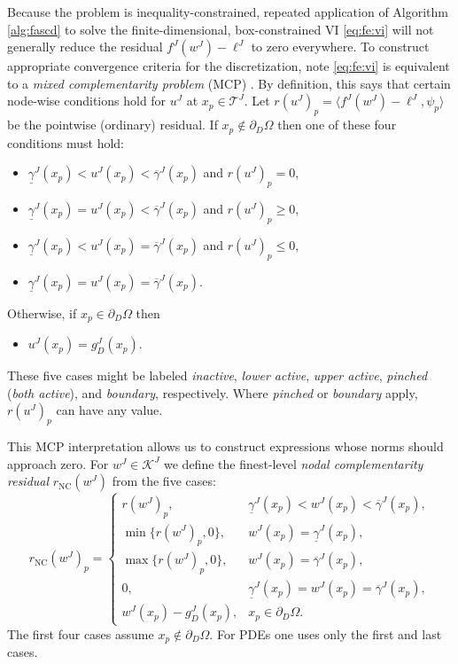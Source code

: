 \documentclass[letterpaper,final,12pt,reqno]{amsart}
\theoremstyle{cstyle}
\theoremstyle{cstyle*}
\theoremstyle{dstyle}
\numberwithin{equation}{section}
\numberwithin{figure}{section}
\numberwithin{table}{section}
\numberwithin{theorem}{section}
\newcommand{\ip}[2]{\langle#1,#2\rangle}
\newcommand{\rNC}{r_{\text{NC}}}
\begin{document}
Because the problem is inequality-constrained, repeated application of Algorithm \ref{alg:fascd} to solve the finite-dimensional, box-constrained VI \eqref{eq:fe:vi} will not generally reduce the residual $f^J(w^J) - \ell^J$ to zero everywhere.  To construct appropriate convergence criteria for the discretization, note \eqref{eq:fe:vi} is equivalent to a \emph{mixed complementarity problem} (MCP) \cite{FacchineiPang2003}.  By definition, this says that certain node-wise conditions hold for $u^J$ at $x_p \in \mathcal{T}^J$.  Let $r(u^J)_p = \ip{f^J(w^J)-\ell^J}{\psi_p}$ be the pointwise (ordinary) residual.  If $x_p \notin \partial_D\Omega$ then one of these four conditions must hold:
\begin{itemize}
\item $\underline{\gamma}^J(x_p)<u^J(x_p)<\overline{\gamma}^J(x_p)$ and $r(u^J)_p = 0$,
\item $\underline{\gamma}^J(x_p)=u^J(x_p)<\overline{\gamma}^J(x_p)$ and $r(u^J)_p \ge 0$,
\item $\underline{\gamma}^J(x_p)<u^J(x_p)=\overline{\gamma}^J(x_p)$ and $r(u^J)_p \le 0$,
\item $\underline{\gamma}^J(x_p)=u^J(x_p)=\overline{\gamma}^J(x_p)$.
\end{itemize}
Otherwise, if $x_p \in \partial_D\Omega$ then
\begin{itemize}
\item $u^J(x_p)=g_D^J(x_p)$.
\end{itemize}
These five cases might be labeled \emph{inactive}, \emph{lower active}, \emph{upper active}, \emph{pinched} (\emph{both active}), and \emph{boundary}, respectively.  Where \emph{pinched} or \emph{boundary} apply, $r(u^J)_p$ can have any value.

This MCP interpretation allows us to construct expressions whose norms should approach zero.  For $w^J \in \mathcal{K}^J$ we define the finest-level \emph{nodal complementarity residual} $\rNC(w^J)$ from the five cases:
\begin{equation}
\rNC(w^J)_p = \begin{cases}
    r(w^J)_p, & \underline{\gamma}^J(x_p) < w^J(x_p) < \overline{\gamma}^J(x_p), \\
    \min\{r(w^J)_p,0\}, & w^J(x_p) = \underline{\gamma}^J(x_p), \\
    \max\{r(w^J)_p,0\}, & w^J(x_p) = \overline{\gamma}^J(x_p), \\
    0, & \underline{\gamma}^J(x_p)=w^J(x_p)=\overline{\gamma}^J(x_p), \\
    w^J(x_p) - g_D^J(x_p), & x_p \in \partial_D\Omega. \end{cases} \label{eq:rNC}
\end{equation}
The first four cases assume $x_p \notin \partial_D\Omega$.  For PDEs one uses only the first and last cases.
\end{document}
